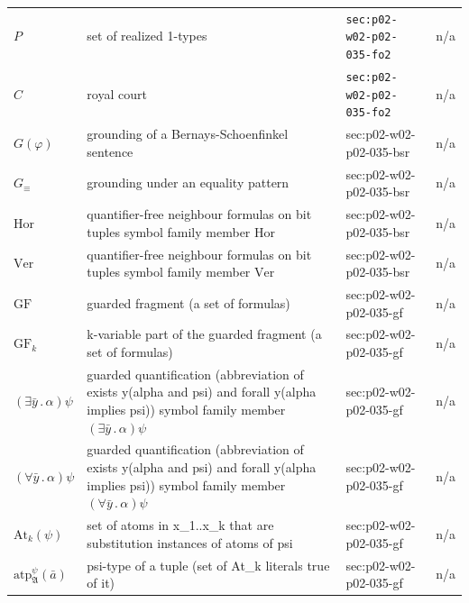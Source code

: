 \begin{longtable}{@{}p{}p{}p{}p{}@{}}
\(P\) & set of realized 1-types & \texttt{sec:\allowbreak{}p02-\allowbreak{}w02-\allowbreak{}p02-\allowbreak{}035-\allowbreak{}fo2} & n/a \\
\(C\) & royal court & \texttt{sec:\allowbreak{}p02-\allowbreak{}w02-\allowbreak{}p02-\allowbreak{}035-\allowbreak{}fo2} & n/a \\
\(G(\varphi)\) & grounding of a Bernays-Schoenfinkel sentence & sec:\allowbreak{}p02-\allowbreak{}w02-\allowbreak{}p02-\allowbreak{}035-\allowbreak{}bsr & n/a \\
\(G_\equiv\) & grounding under an equality pattern & sec:\allowbreak{}p02-\allowbreak{}w02-\allowbreak{}p02-\allowbreak{}035-\allowbreak{}bsr & n/a \\
\(\mathrm{Hor}\) & quantifier-free neighbour formulas on bit tuples symbol family member \(\mathrm{Hor}\) & sec:\allowbreak{}p02-\allowbreak{}w02-\allowbreak{}p02-\allowbreak{}035-\allowbreak{}bsr & n/a \\
\(\mathrm{Ver}\) & quantifier-free neighbour formulas on bit tuples symbol family member \(\mathrm{Ver}\) & sec:\allowbreak{}p02-\allowbreak{}w02-\allowbreak{}p02-\allowbreak{}035-\allowbreak{}bsr & n/a \\
\(\mathrm{GF}\) & guarded fragment (a set of formulas) & sec:\allowbreak{}p02-\allowbreak{}w02-\allowbreak{}p02-\allowbreak{}035-\allowbreak{}gf & n/a \\
\(\mathrm{GF}_k\) & k-variable part of the guarded fragment (a set of formulas) & sec:\allowbreak{}p02-\allowbreak{}w02-\allowbreak{}p02-\allowbreak{}035-\allowbreak{}gf & n/a \\
\((\exists\bar y\,.\,\alpha)\psi\) & guarded quantification (abbreviation of exists y(alpha and psi) and forall y(alpha implies psi)) symbol family member \((\exists\bar y\,.\,\alpha)\psi\) & sec:\allowbreak{}p02-\allowbreak{}w02-\allowbreak{}p02-\allowbreak{}035-\allowbreak{}gf & n/a \\
\((\forall\bar y\,.\,\alpha)\psi\) & guarded quantification (abbreviation of exists y(alpha and psi) and forall y(alpha implies psi)) symbol family member \((\forall\bar y\,.\,\alpha)\psi\) & sec:\allowbreak{}p02-\allowbreak{}w02-\allowbreak{}p02-\allowbreak{}035-\allowbreak{}gf & n/a \\
\(\mathrm{At}_k(\psi)\) & set of atoms in x\_1..x\_k that are substitution instances of atoms of psi & sec:\allowbreak{}p02-\allowbreak{}w02-\allowbreak{}p02-\allowbreak{}035-\allowbreak{}gf & n/a \\
\(\mathrm{atp}^{\psi}_{\mathfrak A}(\bar a)\) & psi-type of a tuple (set of At\_k literals true of it) & sec:\allowbreak{}p02-\allowbreak{}w02-\allowbreak{}p02-\allowbreak{}035-\allowbreak{}gf & n/a \\

\end{longtable}
